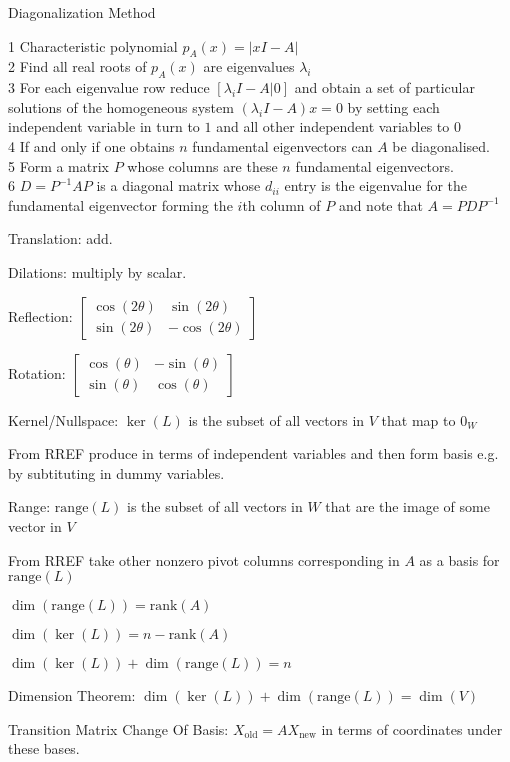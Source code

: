 Diagonalization Method

1 Characteristic polynomial $p_A (x) = |xI-A|$ \\
2 Find all real roots of $p_A (x)$ are eigenvalues $\lambda_i$ \\
3 For each eigenvalue row reduce $[\lambda_i I - A | 0]$ and obtain a set of particular solutions of the homogeneous system $(\lambda_i I -A)x = 0$ by setting each independent variable in turn to $1$ and all other independent variables to $0$ \\
4 If and only if one obtains $n$ fundamental eigenvectors can $A$ be diagonalised. \\
5 Form a matrix $P$ whose columns are these $n$ fundamental eigenvectors. \\
6 $D=P^{-1}AP$ is a diagonal matrix whose $d_{ii}$ entry is the eigenvalue for the fundamental eigenvector forming the $i$th column of $P$ and note that $A=PDP^{-1}$

Translation: add.

Dilations: multiply by scalar.

Reflection: $\begin{bmatrix} \cos (2 \theta) & \sin (2 \theta) \\ \sin (2 \theta) & -\cos (2 \theta) \end{bmatrix}$

Rotation: $\begin{bmatrix} \cos (\theta) & -\sin (\theta) \\ \sin (\theta) & \cos (\theta) \end{bmatrix}$

Kernel/Nullspace: $\ker (L)$ is the subset of all vectors in $V$ that map to $0_W$

From RREF produce in terms of independent variables and then form basis e.g. by subtituting in dummy variables.

Range: $\text{range} (L)$ is the subset of all vectors in $W$ that are the image of some vector in $V$

From RREF take other nonzero pivot columns corresponding in $A$ as a basis for $\text{range} (L)$

$\dim (\text{range} (L))=\text{rank} (A)$

$\dim (\ker (L)) = n-\text{rank} (A)$

$\dim (\ker (L))+\dim (\text{range} (L)) = n$

Dimension Theorem: $\dim (\ker (L))+\dim (\text{range} (L)) = \dim (V)$

Transition Matrix Change Of Basis: $X_{\text{old}}=AX_{\text{new}}$ in terms of coordinates under these bases.

